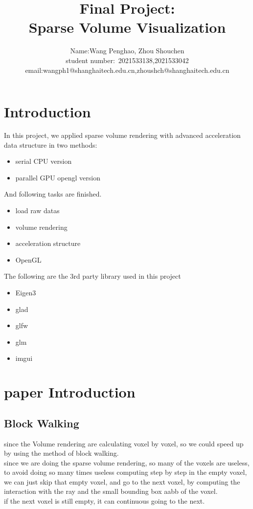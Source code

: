 \documentclass[acmtog]{acmart}
\title{Final Project:\\ {Sparse Volume Visualization}}
\author{Name:\quad  Wang Penghao, Zhou Shouchen  \\ student number:\ 2021533138,2021533042
\\email:wangph1@shanghaitech.edu.cn,zhoushch@shanghaitech.edu.cn}
\begin{document}
\maketitle

\vspace*{2 ex}

\section{Introduction}
In this project, we applied sparse volume rendering with advanced acceleration data structure in two methods: \\
\begin{itemize}
	\item serial CPU version
	\item parallel GPU opengl version
\end{itemize}
And following tasks are finished.\\
\begin{itemize}
\item load raw datas
\item volume rendering
\item acceleration structure
\item OpenGL
\end{itemize}
The following are the 3rd party library used in this project
\begin{itemize}
	\item Eigen3
	\item glad
	\item glfw
	\item glm
	\item imgui
\end{itemize}

\section{paper Introduction}
\subsection{Block Walking}
since the Volume rendering are calculating voxel by voxel, so we could speed up by using the method of block walking.\\
since we are doing the sparse volume rendering, so many of the voxels are useless,\\
to avoid doing so many times useless computing step by step in the empty voxel,\\
we can just skip that empty voxel, and go to the next voxel, by computing the interaction with the
ray and the small bounding box aabb of the voxel.\\
if the next voxel is still empty, it can continuous going to the next.\\
\end{document}
